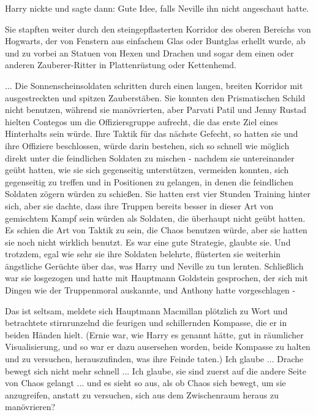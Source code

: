 Harry nickte und sagte dann: \glqq{}Gute Idee\grqq{}, falls Neville ihn nicht
angeschaut hatte.

Sie stapften weiter durch den steingepflasterten Korridor des oberen Bereichs
von Hogwarts, der von Fenstern aus einfachem Glas oder Buntglas erhellt wurde,
ab und zu vorbei an Statuen von Hexen und Drachen und sogar dem einen oder
anderen Zauberer-Ritter in Plattenrüstung oder Kettenhemd.

... Die Sonnenscheinsoldaten schritten durch einen langen, breiten Korridor mit
ausgestreckten und spitzen Zauberstäben. Sie konnten den Prismatischen Schild
nicht benutzen, während sie manövrierten, aber Parvati Patil und Jenny Rustad
hielten Contegos um die Offiziersgruppe aufrecht, die das erste Ziel eines
Hinterhalts sein würde. Ihre Taktik für das nächste Gefecht, so hatten sie und
ihre Offiziere beschlossen, würde darin bestehen, sich so schnell wie möglich
direkt unter die feindlichen Soldaten zu mischen - nachdem sie untereinander
geübt hatten, wie sie sich gegenseitig unterstützen, vermeiden konnten, sich
gegenseitig zu treffen und in Positionen zu gelangen, in denen die feindlichen
Soldaten zögern würden zu schießen. Sie hatten erst vier Stunden Training hinter
sich, aber sie dachte, dass ihre Truppen bereits besser in dieser Art von
gemischtem Kampf sein würden als Soldaten, die überhaupt nicht geübt hatten. Es
schien die Art von Taktik zu sein, die Chaos benutzen würde, aber sie hatten sie
noch nicht wirklich benutzt. Es war eine gute Strategie, glaubte sie. Und
trotzdem, egal wie sehr sie ihre Soldaten belehrte, flüsterten sie weiterhin
ängstliche Gerüchte über das, was Harry und Neville zu tun lernten. Schließlich
war sie losgezogen und hatte mit Hauptmann Goldstein gesprochen, der sich mit
Dingen wie der Truppenmoral auskannte, und Anthony hatte vorgeschlagen -

\glqq{}Das ist seltsam\grqq{}, meldete sich Hauptmann Macmillan plötzlich zu Wort
und betrachtete stirnrunzelnd die feurigen und schillernden Kompasse, die er in
beiden Händen hielt. (Ernie war, wie Harry es genannt hätte, \glqq{}gut in
räumlicher Visualisierung\grqq{}, und so war er dazu ausersehen worden, beide
Kompasse zu halten und zu versuchen, herauszufinden, was ihre Feinde taten.)
\glqq{}Ich glaube ... Drache bewegt sich nicht mehr schnell ... Ich glaube, sie
sind zuerst auf die andere Seite von Chaos gelangt ... und es sieht so aus, als
ob Chaos sich bewegt, um sie anzugreifen, anstatt zu versuchen, sich aus dem
Zwischenraum heraus zu manövrieren?\grqq{}

